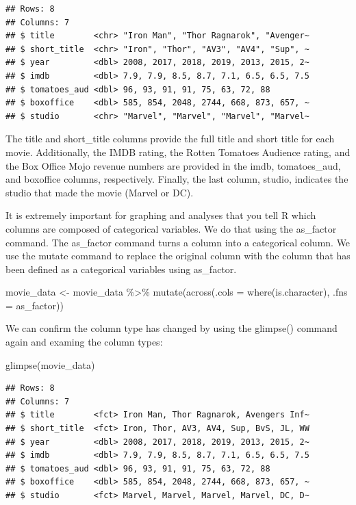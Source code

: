 \documentclass[
]{krantz}
\makeatletter
\newenvironment{Shaded}{\begin{snugshade}}{\end{snugshade}}
\newcommand{\AttributeTok}[1]{\textcolor[rgb]{0.61,0.61,0.61}{#1}}
\newcommand{\FunctionTok}[1]{\textcolor[rgb]{0,0,0}{#1}}
\newcommand{\NormalTok}[1]{#1}
\newcommand{\OtherTok}[1]{\textcolor[rgb]{0.37,0.37,0.37}{#1}}
\newcommand{\SpecialCharTok}[1]{\textcolor[rgb]{0,0,0}{#1}}
\newenvironment{kframe}{%
\medskip{}
\setlength{\fboxsep}{.8em}
 \def\at@end@of@kframe{}%
 \ifinner\ifhmode%
  \def\at@end@of@kframe{\end{minipage}}%
  \begin{minipage}{\columnwidth}%
 \fi\fi%
 \def\FrameCommand##1{\hskip\@totalleftmargin \hskip-\fboxsep
 \colorbox{shadecolor}{##1}\hskip-\fboxsep
     \hskip-\linewidth \hskip-\@totalleftmargin \hskip\columnwidth}%
 \MakeFramed {\advance\hsize-\width
   \@totalleftmargin\z@ \linewidth\hsize
   \@setminipage}}%
 {\par\unskip\endMakeFramed%
 \at@end@of@kframe}
\renewenvironment{Shaded}{\begin{kframe}}{\end{kframe}}
\makeatother
\begin{document}
\begin{verbatim}
## Rows: 8
## Columns: 7
## $ title        <chr> "Iron Man", "Thor Ragnarok", "Avenger~
## $ short_title  <chr> "Iron", "Thor", "AV3", "AV4", "Sup", ~
## $ year         <dbl> 2008, 2017, 2018, 2019, 2013, 2015, 2~
## $ imdb         <dbl> 7.9, 7.9, 8.5, 8.7, 7.1, 6.5, 6.5, 7.5
## $ tomatoes_aud <dbl> 96, 93, 91, 91, 75, 63, 72, 88
## $ boxoffice    <dbl> 585, 854, 2048, 2744, 668, 873, 657, ~
## $ studio       <chr> "Marvel", "Marvel", "Marvel", "Marvel~
\end{verbatim}

The title and short\_title columns provide the full title and short title for each movie. Additionally, the IMDB rating, the Rotten Tomatoes Audience rating, and the Box Office Mojo revenue numbers are provided in the imdb, tomatoes\_aud, and boxoffice columns, respectively. Finally, the last column, studio, indicates the studio that made the movie (Marvel or DC).

It is extremely important for graphing and analyses that you tell R which columns are composed of categorical variables. We do that using the as\_factor command. The as\_factor command turns a column into a categorical column. We use the mutate command to replace the original column with the column that has been defined as a categorical variables using as\_factor.

\begin{Shaded}
\begin{Highlighting}[]
\NormalTok{movie\_data }\OtherTok{\textless{}{-}}\NormalTok{ movie\_data }\SpecialCharTok{\%\textgreater{}\%} 
  \FunctionTok{mutate}\NormalTok{(}\FunctionTok{across}\NormalTok{(}\AttributeTok{.cols =} \FunctionTok{where}\NormalTok{(is.character), }
                \AttributeTok{.fns =}\NormalTok{ as\_factor))}
\end{Highlighting}
\end{Shaded}

We can confirm the column type has changed by using the glimpse() command again and examing the column types:

\begin{Shaded}
\begin{Highlighting}[]
\FunctionTok{glimpse}\NormalTok{(movie\_data)}
\end{Highlighting}
\end{Shaded}

\begin{verbatim}
## Rows: 8
## Columns: 7
## $ title        <fct> Iron Man, Thor Ragnarok, Avengers Inf~
## $ short_title  <fct> Iron, Thor, AV3, AV4, Sup, BvS, JL, WW
## $ year         <dbl> 2008, 2017, 2018, 2019, 2013, 2015, 2~
## $ imdb         <dbl> 7.9, 7.9, 8.5, 8.7, 7.1, 6.5, 6.5, 7.5
## $ tomatoes_aud <dbl> 96, 93, 91, 91, 75, 63, 72, 88
## $ boxoffice    <dbl> 585, 854, 2048, 2744, 668, 873, 657, ~
## $ studio       <fct> Marvel, Marvel, Marvel, Marvel, DC, D~
\end{verbatim}
\end{document}
